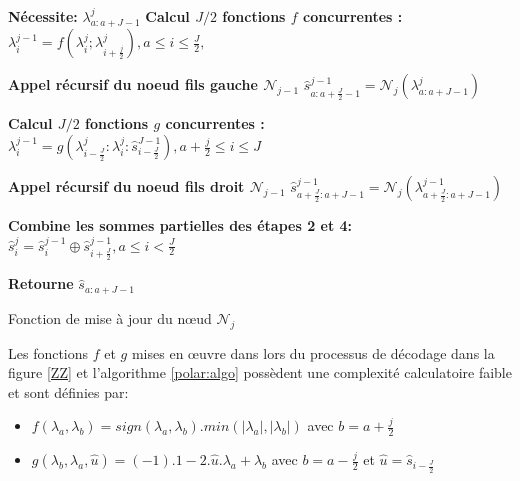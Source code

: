 \documentclass[../main.tex]{subfiles}
\begin{document}
\begin{algorithm}[tb]
    \begin{algorithmic}[1]
        \Statex \textbf{Nécessite:} $\lambda^j_{a:a+J-1}$ 
        \Statex \hspace{3mm} \textbf{Calcul $J/2$ fonctions $f$ concurrentes :}
        \State \hspace{3mm} $\lambda^{j-1}_i = f( \lambda^j_i; \lambda^j_{i+\frac{j}{2}}) , a \leq i \leq \frac{J}{2},$

        \Statex \hspace{3mm} \textbf{Appel récursif du noeud fils gauche $\mathcal{N}_{j-1}$}
        \State \hspace{3mm}  $\hat{s}^{j-1}_{a:a+\frac{J}{2}-1}=\mathcal{N}_j(\lambda^j_{a:a+J-1})$

        \Statex \hspace{3mm} \textbf{Calcul $J/2$ fonctions $g$ concurrentes :}
        \State \hspace{3mm} $\lambda^{j-1}_i = g( \lambda^j_{i-\frac{J}{2}} : \lambda^j_i:\hat{s}^{J-1}_{i-\frac{J}{2}}), a+\frac{j}{2}\leq i \leq J $

        \Statex \hspace{3mm} \textbf{Appel récursif du noeud fils droit $\mathcal{N}_{j-1}$}
        \State \hspace{3mm} $\hat{s}^{j-1}_{a+\frac{J}{2}:a+J-1} =\mathcal{N}_j(\lambda^{j-1}_{a+\frac{J}{2}:a+J-1})$

        \Statex \hspace{3mm} \textbf{Combine les sommes partielles des étapes 2 et 4:}
        \State \hspace{3mm} $\hat{s}^j_i = \hat{s}^{j-1}_i\oplus\hat{s}^{j-1}_{i+\frac{J}{2}},a\leq i < \frac{J}{2}$
        
        \State \hspace{3mm} \textbf{Retourne} $\hat{s}_{a:a+J-1}$        
    \end{algorithmic}
\caption{Fonction de mise à jour du nœud $\mathcal{N}_j$ }
\label{polar:algo}
\end{algorithm}
Les fonctions $f$ et $g$ mises en œuvre dans lors du processus de décodage dans la figure \ref{ZZ} et l’algorithme \ref{polar:algo} possèdent une complexité calculatoire faible et sont définies par:
\begin{itemize}
    \item $f(\lambda_a ,\lambda_b) = sign(\lambda_a,\lambda_b).min(|\lambda_a|,|\lambda_b| )$ avec $b=a+\frac{j}{2}$
    \item $g(\lambda_b ,\lambda_a, \hat{u}) = (-1).1-2.\hat{u}. \lambda_a +\lambda_b$ avec $b=a-\frac{j}{2}$ et $\hat{u}=\hat{s}_{i-\frac{J}{2}}$
\end{itemize}
\end{document}
